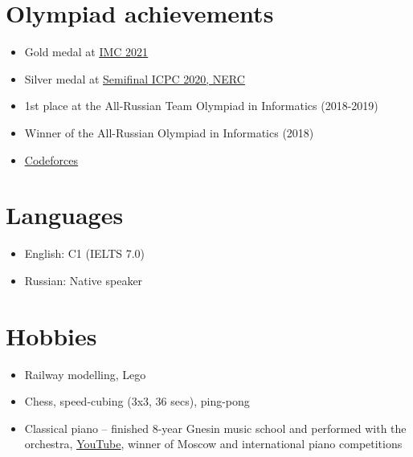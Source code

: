 \documentclass[letterpaper,11pt]{article}
\newcommand{\resumeItemListStart}{\begin{itemize}}
\newcommand{\resumeItemListEnd}{\end{itemize}\vspace{-8pt}}
\newcommand{\resumeItem}[1]{\item\small{{#1 \vspace{-2pt}}}}
\newcommand{\resumeSubItem}[1]{\resumeItem{#1}\vspace{-4pt}}
\begin{document}
\section{Olympiad achievements}
    \resumeItemListStart
        \resumeSubItem{Gold medal at \href{https://imc-math.org.uk/?year=2021}{\underline{IMC 2021}}}
        \resumeSubItem{Silver medal at \href{https://neerc.ifmo.ru/archive/2020.html}{\underline{Semifinal ICPC 2020, NERC}}}
        \resumeSubItem{1st place at the All-Russian Team Olympiad in Informatics (2018-2019)}
        \resumeSubItem{Winner of the All-Russian Olympiad in Informatics (2018)}
        \resumeSubItem{\href{https://codeforces.com/profile/Kuyan}{\underline{Codeforces}}}
    \resumeItemListEnd


\section{Languages}
    \resumeItemListStart
        \resumeSubItem{English: C1 (IELTS 7.0)}
        \resumeSubItem{Russian: Native speaker}
    \resumeItemListEnd


\section{Hobbies}
    \resumeItemListStart
        \resumeSubItem{Railway modelling, Lego}
        \resumeSubItem{Chess, speed-cubing (3x3, 36 secs), ping-pong}
        \resumeSubItem{Classical piano -- finished 8-year Gnesin music school and performed with the orchestra, \href{https://www.youtube.com/user/FeodorKuyanov/playlists}{\underline{YouTube}}, winner of Moscow and international piano competitions}
    \resumeItemListEnd
\end{document}

